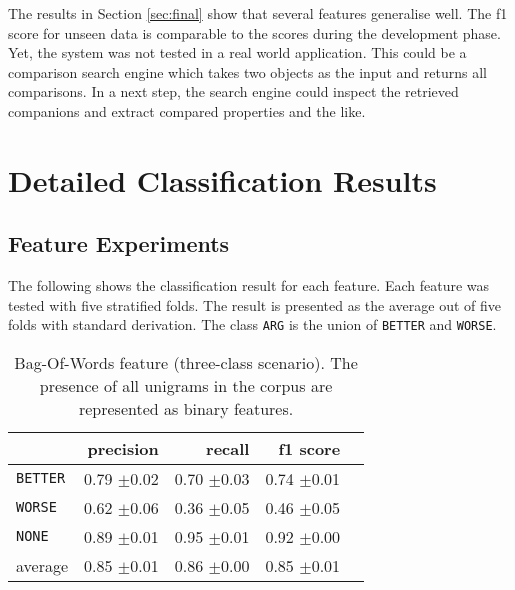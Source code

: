 The results in Section \ref{sec:final} show that several features generalise well. The f1 score for unseen data is comparable to the scores during the development phase. Yet, the system was not tested in a real world application. This could be a comparison search engine which takes two objects as the input and returns all comparisons. In a next step, the search engine could inspect the retrieved companions and extract compared properties and the like.

\appendix

	\chapter{Detailed Classification Results}
\section{Feature Experiments}
	\setcounter{section}{1}
	The following shows the classification result for each feature. Each feature was tested with five stratified folds. The result is presented as the average out of five folds with standard derivation. The class \texttt{ARG} is the union of \texttt{BETTER} and \texttt{WORSE}.
	

	
	\begin{table}[htbp] 
		\centering 
		\caption{Bag-Of-Words feature (three-class scenario). The presence of all unigrams in the corpus are represented as binary features.} 
		\label{  }
		\begin{tabular}{@{}lrrrr@{}}
			\toprule
			        & precision                & recall                   & f1 score                 \\ \midrule 
			\texttt{BETTER}	&	 0.79 \scriptsize{$\pm$0.02} &	 0.70 \scriptsize{$\pm$0.03} &	 0.74 \scriptsize{$\pm$0.01}  \\ 
\texttt{WORSE}	&	 0.62 \scriptsize{$\pm$0.06} &	 0.36 \scriptsize{$\pm$0.05} &	 0.46 \scriptsize{$\pm$0.05}  \\ 
\texttt{NONE}	&	 0.89 \scriptsize{$\pm$0.01} &	 0.95 \scriptsize{$\pm$0.01} &	 0.92 \scriptsize{$\pm$0.00}  \\ 
average	&	 0.85 \scriptsize{$\pm$0.01} &	 0.86 \scriptsize{$\pm$0.00} &	 0.85 \scriptsize{$\pm$0.01}  \\ 			\bottomrule
		\end{tabular}
	\end{table}
	
